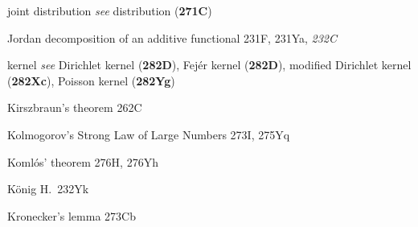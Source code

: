 joint distribution {\it see} distribution ({\bf 271C})




Jordan decomposition of an additive functional 231F, 231Ya,
{\it 232C}



\indexmedskip





































kernel 
  {\it see}
Dirichlet kernel ({\bf 282D}), Fej\'er kernel ({\bf 282D}),
modified Dirichlet kernel ({\bf 282Xc}),
Poisson kernel ({\bf 282Yg})






Kirszbraun's theorem 262C











Kolmogorov's Strong Law of Large Numbers 273I, 275Yq







Koml\'os' theorem 276H, 276Yh


K\"onig H.\ 232Yk








\indexheader{\Krein}




Kronecker's lemma 273Cb

















